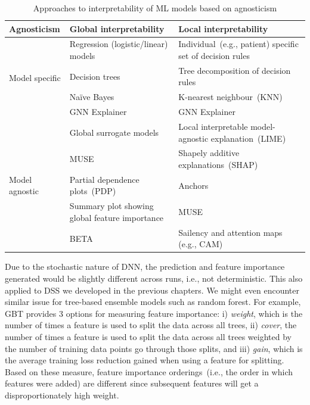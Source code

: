 \begin{table}[h]
    \centering
    \scriptsize
    \caption{Approaches to interpretability of ML models based on agnosticism}
    \label{tab:global_vs_lical_xai}
    \vspace{-2mm}
    \begin{tabular}{l|l|l} 
        \hline
        \textbf{Agnosticism}  & \textbf{Global interpretability}  & \textbf{Local interpretability} \\ 
        \hline
        \multirow{4}{*}{Model specific} & Regression (logistic/linear) models & Individual~(e.g., patient) specific set of decision rules \\ 
        \cline{2-3}
        & Decision trees & Tree decomposition of decision rules \\ 
        \cline{2-3}
        & Naïve Bayes & K-nearest neighbour~(KNN)\\ 
        \cline{2-3}
        & GNN Explainer~\cite{GNNEXPLAINER} & GNN Explainer~\cite{GNNEXPLAINER} \\ 
        \hline
        \multirow{5}{*}{Model agnostic} & Global surrogate models  & Local interpretable model-agnostic explanation~(LIME)~\cite{LIME}\\ 
        \cline{2-3}
        &  MUSE  & Shapely additive explanations~(SHAP)~\cite{SHAP}\\ 
        \cline{2-3}
        & Partial dependence plots~(PDP) & Anchors~\cite{ribeiro2018anchors} \\ 
        \cline{2-3}
        & Summary plot showing global feature importance & MUSE \\ 
        \cline{2-3}
        & BETA~\cite{BETA} & Sailency and attention maps (e.g., CAM)\\ 
        \hline
    \end{tabular}
    \vspace{-4mm}
\end{table}

\hspace*{3.5mm} Due to the stochastic nature of DNN, the prediction and feature importance generated would be slightly different across runs, i.e., not deterministic. This also applied to DSS we developed in the previous chapters. We might even encounter similar issue for tree-based ensemble models such as random forest. For example, GBT provides 3 options for measuring feature importance: i) \emph{weight}, which is the number of times a feature is used to split the data across all trees, ii) \emph{cover}, the number of times a feature is used to split the data across all trees weighted by the number of training data points go through those splits, and iii) \emph{gain}, which is the average training loss reduction gained when using a feature for splitting. Based on these measure, feature importance orderings~(i.e., the order in which features were added) are different since subsequent features will get a disproportionately high weight.

